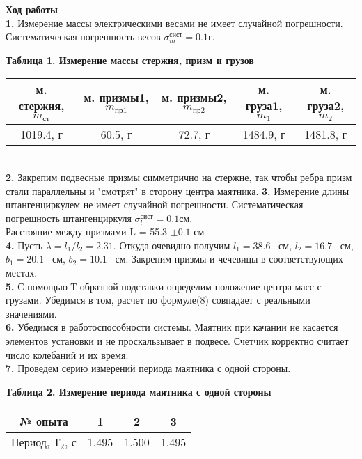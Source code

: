 \documentclass[a4paper, 12pt]{article}
\begin{document}
\textbf{Ход работы}\\
\textbf{1.} Измерение массы электрическими весами не имеет случайной погрешности. Систематическая погрешность весов $\sigma^{сист}_m = 0.1 г$.\\
\begin{table}[h!]
	\textbf{Таблица 1. Измерение массы стержня, призм и грузов}\\
	\centering
	\begin{center}
		\begin{tabular}{|c|c|c|c|c|}
			\hline
			м. стержня, $m_{ст}$ & м. призмы1, $m_{пр1}$ & м. призмы2, $m_{пр2}$& м. груза1, $m_{1}$& м. груза2, $m_{2}$\\
			\hline
			1019.4, г  & 60.5, г & 72.7, г & 1484.9, г & 1481.8, г\\
			\hline
		\end{tabular}
	\end{center}
\end{table}\\
\textbf{2.} Закрепим подвесные призмы симметрично на стержне, так чтобы ребра призм стали параллельны и "смотрят" в сторону центра маятника.
\textbf{3.} Измерение длины штангенциркулем не имеет случайной погрешности. Систематическая погрешность штангенциркуля $\sigma^{сист}_l = 0.1 см$.\\
Расстояние между призмами L = 55.3  $\pm 0.1 $ см\\
\textbf{4.}  Пусть $\lambda = l_1/l_2 = 2.31$. Откуда очевидно получим $l_1 = 38.6\hspace{10pt} см$, $l_2 = 16.7 \hspace{10pt}см$, $ b_1 = 20.1\hspace{10pt} см$, $b_2 = 10.1\hspace{10pt} см$. 
Закрепим призмы и чечевицы в соответствующих местах.\\
\textbf{5.}
С помощью Т-образной подставки определим положение центра масс с грузами. Убедимся в том, расчет по формуле(8) совпадает с реальными значениями.\\
\textbf{6.} Убедимся в работоспособности системы. Маятник при качании не касается элементов установки и не проскальзывает в подвесе. Счетчик корректно считает число колебаний и их время.\\
\textbf{7.} Проведем серию измерений периода маятника с одной стороны.\\
\begin{table}[h!]
	\textbf{Таблица 2. Измерение периода маятника с одной стороны}\\
	\centering
	\begin{center}
		\begin{tabular}{|c|c|c|c|}
			\hline
			№ опыта & 1 & 2 & 3 \\
			\hline
			Период, $Т_2$, с  & 1.495 & 1.500 & 1.495 \\
			\hline
		\end{tabular}
	\end{center}
\end{table}\\
\end{document}
